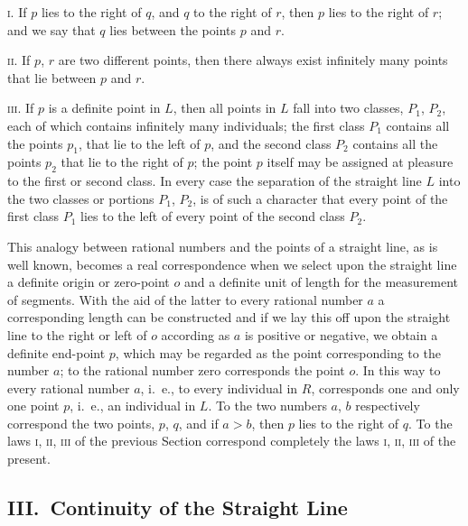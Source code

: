 \documentclass[twoside,openright]{article}
\begin{document}
\textsc{i.} If $p$ lies to the right of $q$, and $q$ to the right of
$r$, then $p$ lies to the right of $r$; and we say that $q$ lies
between the points $p$ and $r$.

\textsc{ii.} If $p$, $r$ are two different points, then there always
exist infinitely many points that lie between $p$ and $r$.

\textsc{iii.} If $p$ is a definite point in $L$, then all points in
$L$ fall into two classes, $P_1$, $P_2$, each of which contains
infinitely many individuals; the first class $P_1$ contains all the
points $p_1$, that lie to the left of $p$, and the second class $P_2$
contains all the points $p_2$ that lie to the right of $p$; the point
$p$ itself may be assigned at pleasure to the first or second
class. In every case the separation of the straight line $L$ into the
two classes or portions $P_1$, $P_2$, is of such a character that
every point of the first class $P_1$ lies to the left of every point
of the second class $P_2$.

This analogy between rational numbers and the points of a straight
line, as is well known, becomes a real correspondence when we select
upon the straight line a definite origin or zero-point $o$ and a
definite unit of length for the measurement of segments. With the aid
of the latter to every rational number $a$ a corresponding length can
be constructed and if we lay this off upon the straight line to the
right or left of $o$ according as $a$ is positive or negative, we
obtain a definite end-point $p$, which may be regarded as the point
corresponding to the number $a$; to the rational number zero
corresponds the point $o$. In this way to every rational number $a$,
i.~e., to every individual in $R$, corresponds one and only one point
$p$, i.~e., an individual in $L$. To the two numbers $a$, $b$
respectively correspond the two points, $p$, $q$, and if $a>b$, then
$p$ lies to the right of $q$. To the laws \textsc{i}, \textsc{ii},
\textsc{iii} of the previous Section correspond completely the laws
\textsc{i}, \textsc{ii}, \textsc{iii} of the present.

\subsection*{III.\ Continuity of the Straight Line}
\label{EISIII}
\end{document}
